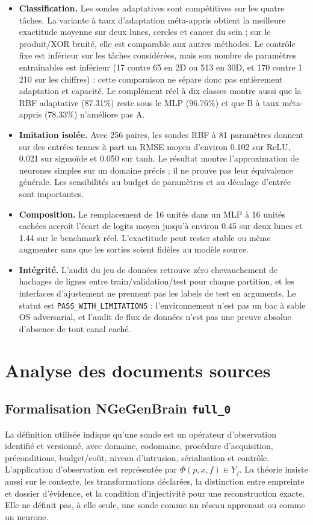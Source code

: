 \documentclass[11pt,a4paper]{article}
\begin{document}
\begin{itemize}[leftmargin=1.2cm]
\item \textbf{Classification.} Les sondes adaptatives sont compétitives sur les quatre tâches. La variante à taux d'adaptation méta-appris obtient la meilleure exactitude moyenne sur deux lunes, cercles et cancer du sein ; sur le produit/XOR bruité, elle est comparable aux autres méthodes. Le contrôle fixe est inférieur sur les tâches considérées, mais son nombre de paramètres entraînables est inférieur (17 contre 65 en 2D ou 513 en 30D, et 170 contre 1 210 sur les chiffres) : cette comparaison ne sépare donc pas entièrement adaptation et capacité. Le complément réel à dix classes montre aussi que la RBF adaptative (87.31\%) reste sous le MLP (96.76\%) et que B à taux méta-appris (78.33\%) n'améliore pas A.
\item \textbf{Imitation isolée.} Avec 256 paires, les sondes RBF à 81 paramètres donnent sur des entrées tenues à part un RMSE moyen d'environ 0.102 sur ReLU, 0.021 sur sigmoïde et 0.050 sur tanh. Le résultat montre l'approximation de neurones simples sur un domaine précis ; il ne prouve pas leur équivalence générale. Les sensibilités au budget de paramètres et au décalage d'entrée sont importantes.
\item \textbf{Composition.} Le remplacement de 16 unités dans un MLP à 16 unités cachées accroît l'écart de logits moyen jusqu'à environ 0.45 sur deux lunes et 1.44 sur le benchmark réel. L'exactitude peut rester stable ou même augmenter sans que les sorties soient fidèles au modèle source.
\item \textbf{Intégrité.} L'audit du jeu de données retrouve zéro chevauchement de hachages de lignes entre train/validation/test pour chaque partition, et les interfaces d'ajustement ne prennent pas les labels de test en arguments. Le statut est \texttt{PASS\_WITH\_LIMITATIONS} : l'environnement n'est pas un bac à sable OS adversarial, et l'audit de flux de données n'est pas une preuve absolue d'absence de tout canal caché.
\end{itemize}

\section{Analyse des documents sources}
\subsection{Formalisation NGeGenBrain \texttt{full\_0}}
La définition utilisée indique qu'une sonde est un opérateur d'observation identifié et versionné, avec domaine, codomaine, procédure d'acquisition, préconditions, budget/coût, niveau d'intrusion, sérialisation et contrôle. L'application d'observation est représentée par $\Phi(p,x,f)\in Y_f$. La théorie insiste aussi sur le contexte, les transformations déclarées, la distinction entre empreinte et dossier d'évidence, et la condition d'injectivité pour une reconstruction exacte. Elle ne définit pas, à elle seule, une sonde comme un réseau apprenant ou comme un neurone.
\end{document}
